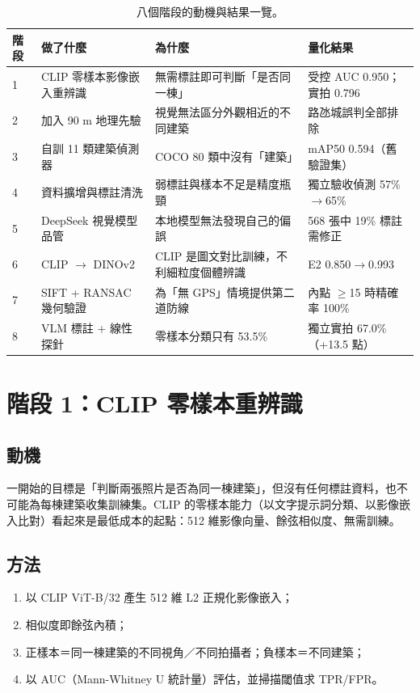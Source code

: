 \documentclass[11pt,a4paper,fontset=windows]{ctexart}
\begin{document}
\begin{table}[H]
\centering\small
\begin{longtable}{@{}p{1.5cm}p{4.6cm}p{5.6cm}p{4.2cm}@{}}
\toprule
\textbf{階段} & \textbf{做了什麼} & \textbf{為什麼} & \textbf{量化結果} \\
\midrule
1 & CLIP 零樣本影像嵌入重辨識 & 無需標註即可判斷「是否同一棟」 & 受控 AUC 0.950；實拍 0.796 \\
2 & 加入 90 m 地理先驗 & 視覺無法區分外觀相近的不同建築 & 路氹城誤判全部排除 \\
3 & 自訓 11 類建築偵測器 & COCO 80 類中沒有「建築」 & mAP50 0.594（舊驗證集） \\
4 & 資料擴增與標註清洗 & 弱標註與樣本不足是精度瓶頸 & 獨立驗收偵測 57\%$\to$65\% \\
5 & DeepSeek 視覺模型品管 & 本地模型無法發現自己的偏誤 & 568 張中 19\% 標註需修正 \\
6 & CLIP $\to$ DINOv2 & CLIP 是圖文對比訓練，不利細粒度個體辨識 & E2 0.850$\to$0.993 \\
7 & SIFT + RANSAC 幾何驗證 & 為「無 GPS」情境提供第二道防線 & 內點 $\ge$15 時精確率 100\% \\
8 & VLM 標註 + 線性探針 & 零樣本分類只有 53.5\% & 獨立實拍 67.0\%（+13.5 點） \\
\bottomrule
\end{longtable}
\caption{八個階段的動機與結果一覽。}
\end{table}

\section{階段 1：CLIP 零樣本重辨識}

\subsection{動機}
一開始的目標是「判斷兩張照片是否為同一棟建築」，但沒有任何標註資料，也不可能為每棟建築收集訓練集。CLIP 的零樣本能力（以文字提示詞分類、以影像嵌入比對）看起來是最低成本的起點：512 維影像向量、餘弦相似度、無需訓練。

\subsection{方法}
\begin{enumerate}[leftmargin=1.4em,itemsep=1pt]
  \item 以 CLIP ViT-B/32 產生 512 維 L2 正規化影像嵌入；
  \item 相似度即餘弦內積；
  \item 正樣本＝同一棟建築的不同視角／不同拍攝者；負樣本＝不同建築；
  \item 以 AUC（Mann-Whitney U 統計量）評估，並掃描閾值求 TPR/FPR。
\end{enumerate}
\end{document}

